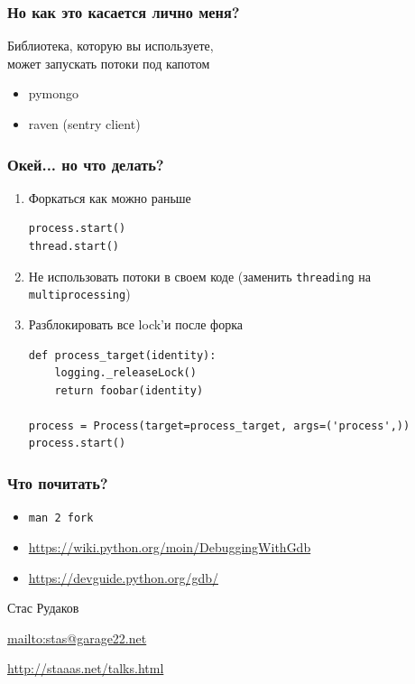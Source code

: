 \documentclass[10pt,pdf,utf8,aspectratio=169,xcolor=dvipsnames,x11names,center]{beamer}
\begin{document}
\begin{frame}
  \frametitle{Но как это касается лично меня?}
  Библиотека, которую вы используете,\\может запускать потоки под капотом
  \begin{itemize}
  \item pymongo
  \item raven (sentry client)
  \end{itemize}
\end{frame}

\begin{frame}[fragile]
  \frametitle{Окей... но что делать?}
  \begin{enumerate}
  \item Форкаться как можно раньше
    \begin{lstlisting}
process.start()
thread.start()
    \end{lstlisting}
    \pause
  \item Не использовать потоки в своем коде (заменить \texttt{threading} на \texttt{multiprocessing})
    \pause
  \item Разблокировать все lock'и после форка
    \begin{lstlisting}
def process_target(identity):
    logging._releaseLock()
    return foobar(identity)
        
process = Process(target=process_target, args=('process',))
process.start()    
    \end{lstlisting}
  \end{enumerate}
\end{frame}

\begin{frame}
  \frametitle{Что почитать?}
  \begin{itemize}
  \item \texttt{man 2 fork}
  \item \url{https://wiki.python.org/moin/DebuggingWithGdb}
  \item \url{https://devguide.python.org/gdb/}
  \end{itemize}
\end{frame}

\begin{frame}
    \begin{block}{Стас Рудаков}
    \par \url{mailto:stas@garage22.net}
    \par \url{http://staaas.net/talks.html}
    \end{block}
\end{frame}
\end{document}
